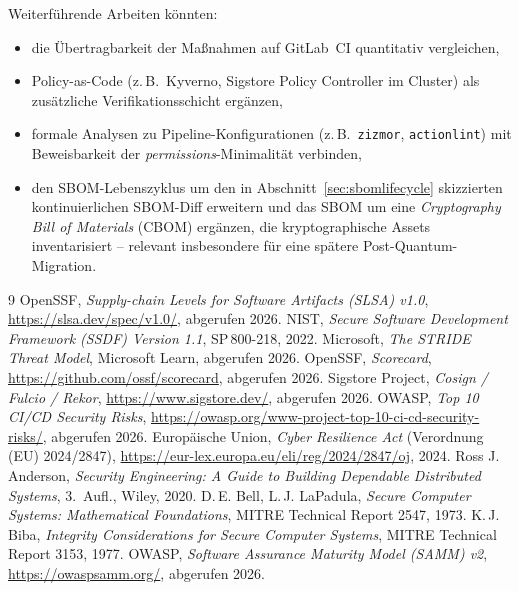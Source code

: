 \documentclass[12pt, a4paper]{scrartcl}
\begin{document}
Weiterführende Arbeiten könnten:
\begin{itemize}[leftmargin=1.4em]
  \item die Übertragbarkeit der Maßnahmen auf GitLab~CI quantitativ
        vergleichen,
  \item Policy-as-Code (z.\,B.\ Kyverno, Sigstore Policy Controller im Cluster)
        als zusätzliche Verifikationsschicht ergänzen,
  \item formale Analysen zu Pipeline-Konfigurationen (z.\,B.\ \texttt{zizmor},
        \texttt{actionlint}) mit Beweisbarkeit der \emph{permissions}-Minimalität
        verbinden,
  \item den SBOM-Lebenszyklus um den in Abschnitt~\ref{sec:sbomlifecycle}
        skizzierten kontinuierlichen SBOM-Diff erweitern und das SBOM um eine
        \emph{Cryptography Bill of Materials} (CBOM) ergänzen, die
        kryptographische Assets inventarisiert -- relevant insbesondere für
        eine spätere Post-Quantum-Migration.
\end{itemize}

\begin{thebibliography}{9}
 OpenSSF, \emph{Supply-chain Levels for Software Artifacts (SLSA) v1.0}, \url{https://slsa.dev/spec/v1.0/}, abgerufen 2026.
 NIST, \emph{Secure Software Development Framework (SSDF) Version 1.1}, SP\,800-218, 2022.
 Microsoft, \emph{The STRIDE Threat Model}, Microsoft Learn, abgerufen 2026.
 OpenSSF, \emph{Scorecard}, \url{https://github.com/ossf/scorecard}, abgerufen 2026.
 Sigstore Project, \emph{Cosign / Fulcio / Rekor}, \url{https://www.sigstore.dev/}, abgerufen 2026.
 OWASP, \emph{Top 10 CI/CD Security Risks}, \url{https://owasp.org/www-project-top-10-ci-cd-security-risks/}, abgerufen 2026.
 Europäische Union, \emph{Cyber Resilience Act} (Verordnung (EU) 2024/2847), \url{https://eur-lex.europa.eu/eli/reg/2024/2847/oj}, 2024.
 Ross J. Anderson, \emph{Security Engineering: A Guide to Building Dependable Distributed Systems}, 3.\ Aufl., Wiley, 2020.
 D.\,E. Bell, L.\,J. LaPadula, \emph{Secure Computer Systems: Mathematical Foundations}, MITRE Technical Report 2547, 1973.
 K.\,J. Biba, \emph{Integrity Considerations for Secure Computer Systems}, MITRE Technical Report 3153, 1977.
 OWASP, \emph{Software Assurance Maturity Model (SAMM) v2}, \url{https://owaspsamm.org/}, abgerufen 2026.
\end{thebibliography}
\end{document}
